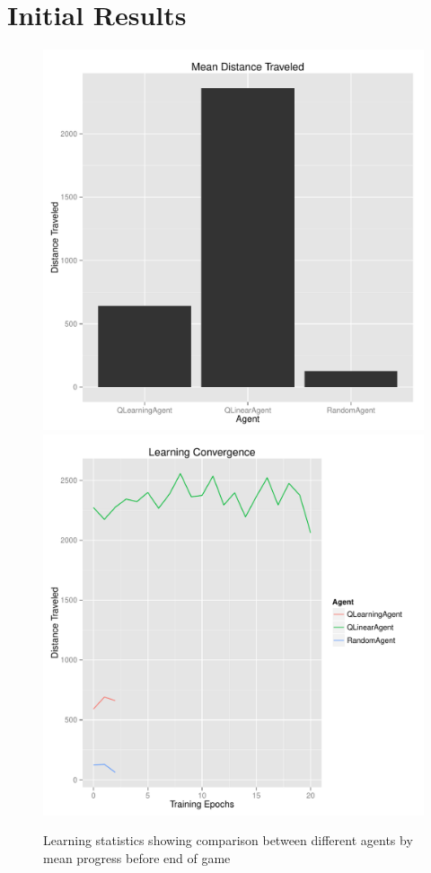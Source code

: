 \documentclass[12pt]{article}
\begin{document}
\section{Initial Results}

\begin{figure}
\includegraphics[scale=0.5]{imgs/dist_bar.pdf}
\includegraphics[scale=0.5]{imgs/dist_line.pdf}
\caption{Learning statistics showing comparison between different agents by mean progress before end of game}
\label{agent_comp}
\end{figure}
\end{document}
